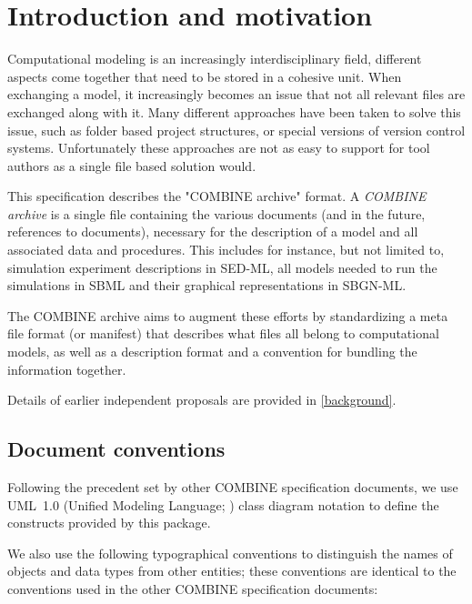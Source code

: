 
\section{ Introduction and motivation } \label{intro} 

Computational modeling is an increasingly interdisciplinary field, 
different aspects come together that need to be stored in a cohesive 
unit. When exchanging a model, it increasingly becomes an issue that not 
all relevant files are exchanged along with it. Many different 
approaches have been taken to solve this issue, such as folder based 
project structures, or special versions of version control systems. 
Unfortunately these approaches are not as easy to support for tool 
authors as a single file based solution would. 

This specification describes the "COMBINE archive" format. A 
\textit{COMBINE archive} is a single file containing the various 
documents (and in the future, references to documents), necessary for 
the description of a model and all associated data and procedures. This 
includes for instance, but not limited to, simulation experiment 
descriptions in SED-ML, all models needed to run the simulations in SBML 
and their graphical representations in SBGN-ML. 

The COMBINE archive aims to augment these efforts by standardizing a 
meta file format (or manifest) that describes what files all belong to 
computational models, as well as a description format and a convention 
for bundling the information together. 

Details of earlier independent proposals are provided in 
\ref{background}. 


\subsection{Document conventions} \label{conventions} 

Following the precedent set by other COMBINE specification
documents, we use UML~1.0 (Unified Modeling Language; 
\citealt{eriksson:1998,oestereich:1999}) class diagram notation to 
define the constructs provided by this package. 

We also use the following typographical conventions to distinguish the 
names of objects and data types from other entities; these conventions 
are identical to the conventions used in the other COMBINE 
specification documents: 

